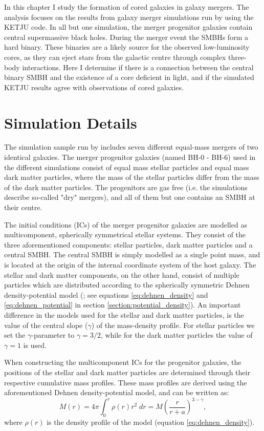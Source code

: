 \documentclass[english, twoside]{HYgradu}
\begin{document}
In this chapter I study the formation of cored galaxies in galaxy mergers. The analysis focuses on the results from galaxy merger simulations run by \cite{Rantala2018} using the KETJU code. In all but one simulation, the merger progenitor galaxies contain central supermassive black holes. During the merger event the SMBHs form a hard binary. These binaries are a likely source for the observed low-luminosity cores, as they can eject stars from the galactic centre through complex three-body interactions. Here I determine if there is a connection between the central binary SMBH and the existence of a core deficient in light, and if the simulated KETJU results agree with observations of cored galaxies.


\section{Simulation Details}

The simulation sample run by \cite{Rantala2018} includes seven different equal-mass mergers of two identical galaxies. The merger progenitor galaxies (named BH-0 - BH-6) used in the different simulations consist of equal mass stellar particles and equal mass dark matter particles, where the mass of the stellar particles differ from the mass of the dark matter particles. The progenitors are gas free (i.e. the simulations describe so-called "dry" mergers), and all of them but one contains an SMBH at their centre.

The initial conditions (ICs) of the merger progenitor galaxies are modelled as multicomponent, spherically symmetrical stellar systems. They consist of the three aforementioned components: stellar particles, dark matter particles and a central SMBH. The central SMBH is simply modelled as a single point mass, and is located at the origin of the internal coordinate system of the host galaxy. The stellar and dark matter components, on the other hand, consist of multiple particles which are distributed according to the spherically symmetric Dehnen density-potential model (\citealt{Dehnen1993}; see equations \ref{eq:dehnen_density} and \ref{eq:dehnen_potential} in section \ref{section:potential_density}). An important difference in the models used for the stellar and dark matter particles, is the value of the central slope ($\gamma$) of the mass-density profile. For stellar particles we set the $\gamma$-parameter to $\gamma = 3/2$, while for the dark matter particles the value of $\gamma = 1$ is used.

When constructing the multicomponent ICs for the progenitor galaxies, the positions of the stellar and dark matter particles are determined through their respective cumulative mass profiles. These mass profiles are derived using the aforementioned Dehnen density-potential model, and can be written as:
\begin{equation}
M(r) = 4\pi \int^r_0 \rho(r)r^2 \;dr = M \left( \frac{r}{r+a} \right)^{3-\gamma}, \label{eq:cumulative_mass}
\end{equation}
where $\rho(r)$ is the density profile of the model (equation \ref{eq:dehnen_density}).
\end{document}
